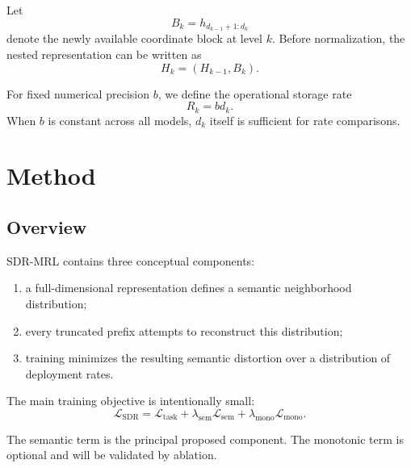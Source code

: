 \documentclass[11pt]{article}
\newcommand{\cL}{\mathcal{L}}
\begin{document}
Let
\begin{equation}
    B_k=h_{d_{k-1}+1:d_k}
\end{equation}
denote the newly available coordinate block at level $k$.
Before normalization, the nested representation can be written as
\begin{equation}
    H_k=(H_{k-1},B_k).
\end{equation}

For fixed numerical precision $b$, we define the operational storage rate
\begin{equation}
    R_k = b d_k.
    \label{eq:storage-rate}
\end{equation}
When $b$ is constant across all models, $d_k$ itself is sufficient for rate comparisons.


\section{Method}
\label{sec:method}

\subsection{Overview}

SDR-MRL contains three conceptual components:

\begin{enumerate}[leftmargin=1.5em]
    \item a full-dimensional representation defines a semantic neighborhood distribution;
    \item every truncated prefix attempts to reconstruct this distribution;
    \item training minimizes the resulting semantic distortion over a distribution of deployment rates.
\end{enumerate}

The main training objective is intentionally small:
\begin{equation}
\boxed{
    \cL_{\mathrm{SDR}}
    =
    \cL_{\mathrm{task}}
    +
    \lambda_{\mathrm{sem}}\cL_{\mathrm{sem}}
    +
    \lambda_{\mathrm{mono}}\cL_{\mathrm{mono}}.
}
\label{eq:main-objective}
\end{equation}

The semantic term is the principal proposed component.
The monotonic term is optional and will be validated by ablation.


\end{document}

